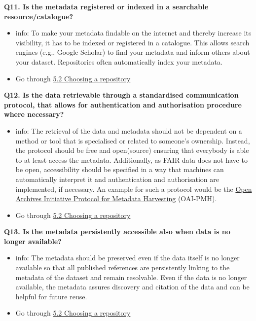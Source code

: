 \documentclass[
  oneside]{book}
\providecommand{\tightlist}{%
  \setlength{\itemsep}{0pt}\setlength{\parskip}{0pt}}
\begin{document}
\textbf{Q11. Is the metadata registered or indexed in a searchable resource/catalogue?}

\begin{itemize}
\tightlist
\item
  info: To make your metadata findable on the internet and thereby increase its visibility, it has to be indexed or registered in a catalogue. This allows search engines (e.g., Google Scholar) to find your metadata and inform others about your dataset. Repositories often automatically index your metadata.
\item
  Go through \hyperref[choosing-a-repository]{5.2 Choosing a repository}
\end{itemize}

\textbf{Q12. Is the data retrievable through a standardised communication protocol, that allows for authentication and authorisation procedure where necessary?}

\begin{itemize}
\tightlist
\item
  info: The retrieval of the data and metadata should not be dependent on a method or tool that is specialised or related to someone's ownership. Instead, the protocol should be free and open(source) ensuring that everybody is able to at least access the metadata. Additionally, as FAIR data does not have to be open, accessibility should be specified in a way that machines can automatically interpret it and authentication and authorisation are implemented, if necessary. An example for such a protocol would be the \href{https://www.openarchives.org/pmh/}{Open Archives Initiative Protocol for Metadata Harvesting} (OAI-PMH).
\item
  Go through \hyperref[choosing-a-repository]{5.2 Choosing a repository}
\end{itemize}

\textbf{Q13. Is the metadata persistently accessible also when data is no longer available?}

\begin{itemize}
\tightlist
\item
  info: The metadata should be preserved even if the data itself is no longer available so that all published references are persistently linking to the metadata of the dataset and remain resolvable. Even if the data is no longer available, the metadata assures discovery and citation of the data and can be helpful for future reuse.
\item
  Go through \hyperref[choosing-a-repository]{5.2 Choosing a repository}
\end{itemize}
\end{document}
